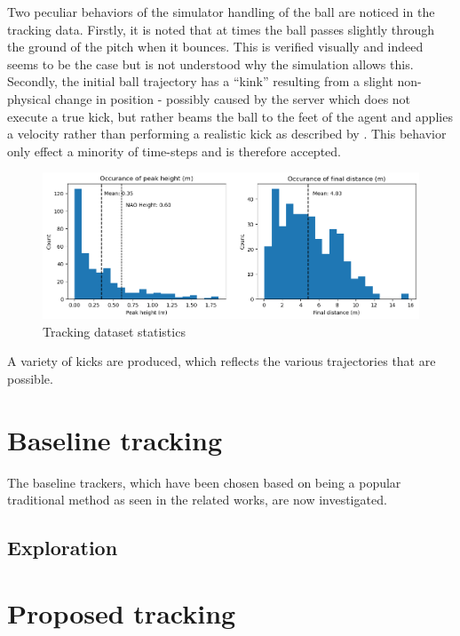 \documentclass[a4paper,twoside,12pt]{report}
\begin{document}
Two peculiar behaviors of the simulator handling of the ball are noticed in the tracking data. Firstly, it is noted that at times the ball passes slightly through the ground of the pitch when it bounces. This is verified visually and indeed seems to be the case but is not understood why the simulation allows this. Secondly, the initial ball trajectory has a ``kink'' resulting from a slight non-physical change in position - possibly caused by the server which does not execute a true kick, but rather beams the ball to the feet of the agent and applies a velocity rather than performing a realistic kick as described by \cite{fatproxy}. This behavior only effect a minority of time-steps and is therefore accepted.

\begin{figure}[h!]
\begin{center}
\includegraphics[width=14cm]{images/trackingplot.png}
\caption{Tracking dataset statistics}
\label{fig:trackplot}
\end{center}
\end{figure}

A variety of kicks are produced, which reflects the various trajectories that are possible. 

\section{Baseline tracking}

The baseline trackers, which have been chosen based on being a popular traditional method as seen in the related works, are now investigated.

\subsection{Exploration}

\section{Proposed tracking}
\end{document}
